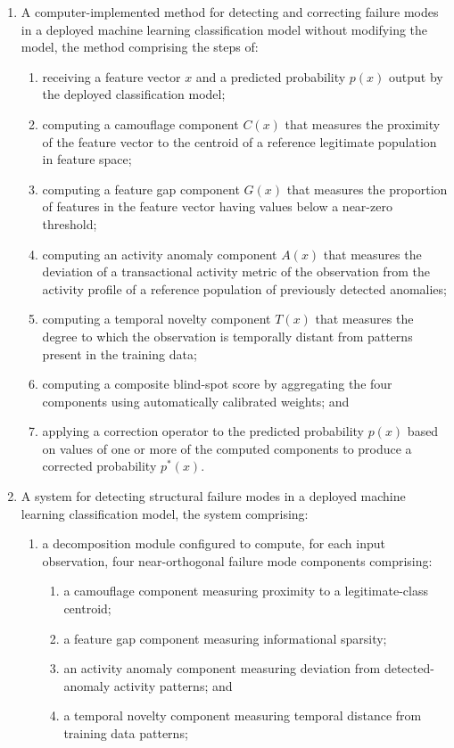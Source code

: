 \documentclass[12pt,a4paper]{article}
\begin{document}
\begin{enumerate}[label=\textbf{\arabic*.}]

\item A computer-implemented method for detecting and correcting failure 
modes in a deployed machine learning classification model without modifying 
the model, the method comprising the steps of:
\begin{enumerate}[label=(\alph*)]
\item receiving a feature vector $x$ and a predicted probability $p(x)$ 
output by the deployed classification model;

\item computing a camouflage component $C(x)$ that measures the proximity 
of the feature vector to the centroid of a reference legitimate population 
in feature space;

\item computing a feature gap component $G(x)$ that measures the proportion 
of features in the feature vector having values below a near-zero threshold;

\item computing an activity anomaly component $A(x)$ that measures the 
deviation of a transactional activity metric of the observation from the 
activity profile of a reference population of previously detected anomalies;

\item computing a temporal novelty component $T(x)$ that measures the 
degree to which the observation is temporally distant from patterns present 
in the training data;

\item computing a composite blind-spot score by aggregating the four 
components using automatically calibrated weights; and

\item applying a correction operator to the predicted probability $p(x)$ 
based on values of one or more of the computed components to produce a 
corrected probability $p^*(x)$.
\end{enumerate}

\item A system for detecting structural failure modes in a deployed machine 
learning classification model, the system comprising:
\begin{enumerate}[label=(\alph*)]
\item a decomposition module configured to compute, for each input 
observation, four near-orthogonal failure mode components comprising:
\begin{enumerate}[label=(\roman*)]
\item a camouflage component measuring proximity to a legitimate-class 
centroid;
\item a feature gap component measuring informational sparsity;
\item an activity anomaly component measuring deviation from detected-anomaly 
activity patterns; and
\item a temporal novelty component measuring temporal distance from training 
data patterns;
\end{enumerate}


\end{enumerate}
\end{enumerate}
\end{document}
